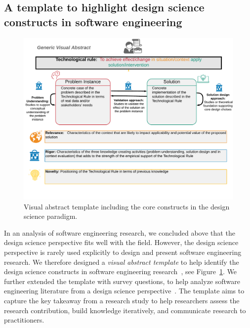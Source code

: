 \documentclass[graybox]{svmult}
\begin{document}
\subsection{A template to highlight design science constructs in software engineering}
\label{sec:VA_template}


\begin{figure}[t]
  \includegraphics[width=1.0\textwidth]{Figures/GenericVA.png}
\caption{Visual abstract template including the core constructs in the design science paradigm.}
\label{fig:VA-template}       %
\end{figure}


In an analysis of software engineering research, we concluded above that the design science perspective fits well with the field. However, the design science perspective is rarely used explicitly to design and present software engineering research. We therefore designed a \emph{visual abstract template} to help identify the design science constructs in software engineering research~\cite{StoreyESEM17}, see Figure~\ref{fig:VA-template}. We further extended the template with survey questions, to help analyze software engineering literature from a design science perspective~\cite{Engstrom19arxiv}. The template aims to capture the key takeaway from a research study to help researchers assess the research contribution, build knowledge iteratively, and communicate research to practitioners. %
\end{document}
